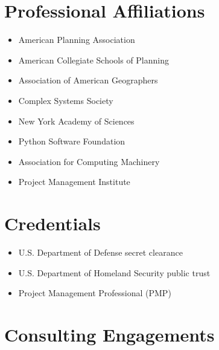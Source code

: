 \documentclass{academiccv}
\begin{document}
\section*{Professional Affiliations}

\begin{itemize}
	
\item American Planning Association

\item American Collegiate Schools of Planning

\item Association of American Geographers

\item Complex Systems Society

\item New York Academy of Sciences

\item Python Software Foundation

\item Association for Computing Machinery

\item Project Management Institute

\end{itemize}



\section*{Credentials}

\begin{itemize}
	
\item U.S. Department of Defense secret clearance

\item U.S. Department of Homeland Security public trust

\item Project Management Professional (PMP)

\end{itemize}



\section*{Consulting Engagements}
\end{document}
